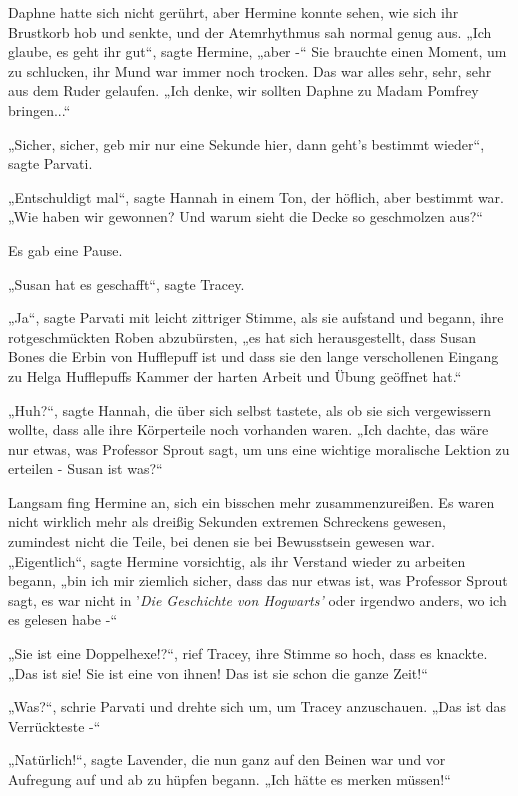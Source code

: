 {Daphne hatte sich nicht gerührt, aber Hermine konnte sehen, wie sich ihr Brustkorb hob und senkte, und der Atemrhythmus sah normal genug aus. „Ich glaube, es geht ihr gut“, sagte Hermine, „aber -“ Sie brauchte einen Moment, um zu schlucken, ihr Mund war immer noch trocken. Das war alles sehr, sehr, sehr aus dem Ruder gelaufen. „Ich denke, wir sollten Daphne zu Madam Pomfrey bringen...“

„Sicher, sicher, geb mir nur eine Sekunde hier, dann geht's bestimmt wieder“, sagte Parvati.

„Entschuldigt mal“, sagte Hannah in einem Ton, der höflich, aber bestimmt war. „Wie haben wir gewonnen? Und warum sieht die Decke so geschmolzen aus?“

Es gab eine Pause.

„Susan hat es geschafft“, sagte Tracey.

„Ja“, sagte Parvati mit leicht zittriger Stimme, als sie aufstand und begann, ihre rotgeschmückten Roben abzubürsten, „es hat sich herausgestellt, dass Susan Bones die Erbin von Hufflepuff ist und dass sie den lange verschollenen Eingang zu Helga Hufflepuffs Kammer der harten Arbeit und Übung geöffnet hat.“

„Huh?“, sagte Hannah, die über sich selbst tastete, als ob sie sich vergewissern wollte, dass alle ihre Körperteile noch vorhanden waren. „Ich dachte, das wäre nur etwas, was Professor Sprout sagt, um uns eine wichtige moralische Lektion zu erteilen - Susan ist was?“

Langsam fing Hermine an, sich ein bisschen mehr zusammenzureißen. Es waren nicht wirklich mehr als dreißig Sekunden extremen Schreckens gewesen, zumindest nicht die Teile, bei denen sie bei Bewusstsein gewesen war.\\ „Eigentlich“, sagte Hermine vorsichtig, als ihr Verstand wieder zu arbeiten begann, „bin ich mir ziemlich sicher, dass das nur etwas ist, was Professor Sprout sagt, es war nicht in '\emph{Die Geschichte von Hogwarts'} oder irgendwo anders, wo ich es gelesen habe -“

„Sie ist eine Doppelhexe!?“, rief Tracey, ihre Stimme so hoch, dass es knackte. „Das ist sie! Sie ist eine von ihnen! Das ist sie schon die ganze Zeit!“

„Was?“, schrie Parvati und drehte sich um, um Tracey anzuschauen. „Das ist das Verrückteste -“

„Natürlich!“, sagte Lavender, die nun ganz auf den Beinen war und vor Aufregung auf und ab zu hüpfen begann. „Ich hätte es merken müssen!“

}
